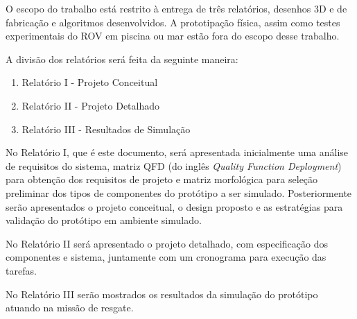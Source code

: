 O escopo do trabalho está restrito à entrega de três relatórios, desenhos 3D e de fabricação e algoritmos desenvolvidos. A prototipação física, assim como testes experimentais do ROV em piscina ou mar estão fora do escopo desse trabalho.

A divisão dos relatórios será feita da seguinte maneira:
\vspace{1.5mm}

\begin{enumerate}
	\item Relatório I - Projeto Conceitual
	\item Relatório II - Projeto Detalhado
	\item Relatório III - Resultados de Simulação
\end{enumerate}
\vspace{1.5mm}
 
No Relatório I, que é este documento, será apresentada inicialmente uma análise de requisitos do sistema, matriz QFD (do inglês \textit{Quality Function Deployment}) para obtenção dos requisitos de projeto e matriz morfológica para seleção preliminar dos tipos de componentes do protótipo a ser simulado. Posteriormente serão apresentados o projeto conceitual, o design proposto e as estratégias para validação do protótipo em ambiente simulado.

No Relatório II será apresentado o projeto detalhado, com especificação dos componentes e sistema, juntamente com um cronograma para execução das tarefas.

No Relatório III serão mostrados os resultados da simulação do protótipo atuando na missão de resgate.